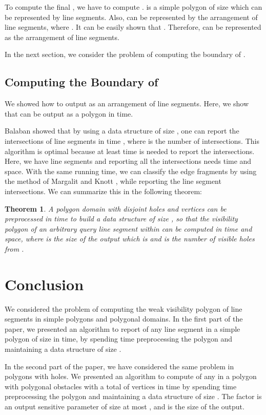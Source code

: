 \documentclass[5p]{elsarticle}
\newtheorem{theorem}{Theorem}
\begin{document}
To compute the final , we have to compute 
. 
 is a simple polygon of size  which can be represented
by  line segments. Also,  can be represented
by the arrangement of  line segments,
where . 
It can be easily shown that . 
Therefore,  can be represented as the arrangement of 
 line segments.

In the next section, we consider the problem of computing the boundary of .

\subsection{Computing the Boundary of }
We showed how to output  as an arrangement of  line segments.
Here, we show that  can be output as a polygon in  time.

Balaban \cite{Bal95} showed that by using a data structure of size , one can report
the intersections of  line segments in time , where  is the number
of intersections. This algorithm is optimal because at least  time is needed
to report the intersections.
Here, we have  line segments and reporting all the intersections
needs  time and  space.
With the same running time, we can classify the edge fragments by using 
the method of Margalit and Knott \cite{MK89}, while reporting the line segment intersections.
We can summarize this in the following theorem:


\begin{theorem}
A polygon domain  with  disjoint holes and  vertices can be 
preprocessed in time  to build a data structure of size , so that the visibility 
polygon of an arbitrary query line segment  within  can be computed in 
 time and  space, where 
 is the size of the output which is  and  is the number of visible holes from . 
\end{theorem}



\section{Conclusion}
We considered the problem of computing the weak visibility polygon of line segments
in simple polygons and polygonal domains. In the first part of the paper, we presented an algorithm to 
report  of any line segment  in a simple polygon of size  in 
 time, by spending  time preprocessing the polygon 
and maintaining a data structure of size . 

In the second part of the paper, we have considered the same problem in polygons with holes. 
We presented an algorithm to compute  of any  
in a polygon with  polygonal obstacles 
with a total of  vertices in time 
by spending  time preprocessing the polygon and maintaining a data structure of
size . The factor  is an output sensitive parameter of size at most
, and  is the size of the output.
\end{document}
